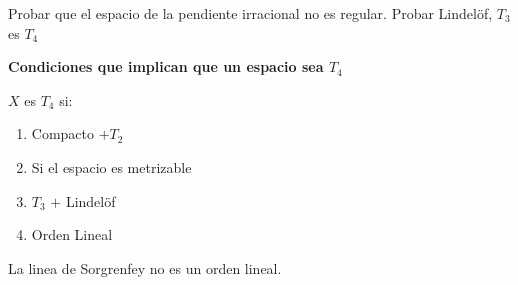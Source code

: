 Probar que el espacio de la pendiente irracional no es regular.
Probar Lindelöf, $ T_3  $ es $ T_4 $

\textbf{Condiciones que implican que un espacio sea $ T_4 $}

$ X $ es $ T_4 $ si:
\begin{enumerate}
	\item Compacto $ + T_2 $ \\
	\item Si el espacio es metrizable
	\item $ T_3 $ $ +  $ Lindelöf
	\item Orden Lineal
\end{enumerate}

La linea de Sorgrenfey no es un orden lineal.